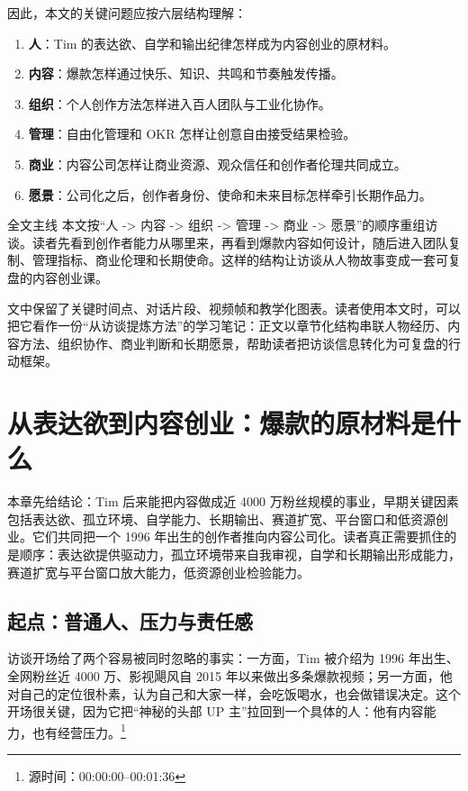 \documentclass[a4paper]{article}
\begin{document}
因此，本文的关键问题应按六层结构理解：

\begin{enumerate}
  \item \textbf{人}：Tim 的表达欲、自学和输出纪律怎样成为内容创业的原材料。
  \item \textbf{内容}：爆款怎样通过快乐、知识、共鸣和节奏触发传播。
  \item \textbf{组织}：个人创作方法怎样进入百人团队与工业化协作。
  \item \textbf{管理}：自由化管理和 OKR 怎样让创意自由接受结果检验。
  \item \textbf{商业}：内容公司怎样让商业资源、观众信任和创作者伦理共同成立。
  \item \textbf{愿景}：公司化之后，创作者身份、使命和未来目标怎样牵引长期作品力。
\end{enumerate}

\begin{importantbox}{全文主线}
本文按“人 -> 内容 -> 组织 -> 管理 -> 商业 -> 愿景”的顺序重组访谈。读者先看到创作者能力从哪里来，再看到爆款内容如何设计，随后进入团队复制、管理指标、商业伦理和长期使命。这样的结构让访谈从人物故事变成一套可复盘的内容创业课。
\end{importantbox}

文中保留了关键时间点、对话片段、视频帧和教学化图表。读者使用本文时，可以把它看作一份“从访谈提炼方法”的学习笔记：正文以章节化结构串联人物经历、内容方法、组织协作、商业判断和长期愿景，帮助读者把访谈信息转化为可复盘的行动框架。

\section{从表达欲到内容创业：爆款的原材料是什么}

本章先给结论：Tim 后来能把内容做成近 4000 万粉丝规模的事业，早期关键因素包括表达欲、孤立环境、自学能力、长期输出、赛道扩宽、平台窗口和低资源创业。它们共同把一个 1996 年出生的创作者推向内容公司化。读者真正需要抓住的是顺序：表达欲提供驱动力，孤立环境带来自我审视，自学和长期输出形成能力，赛道扩宽与平台窗口放大能力，低资源创业检验能力。

\subsection{起点：普通人、压力与责任感}

访谈开场给了两个容易被同时忽略的事实：一方面，Tim 被介绍为 1996 年出生、全网粉丝近 4000 万、影视飓风自 2015 年以来做出多条爆款视频；另一方面，他对自己的定位很朴素，认为自己和大家一样，会吃饭喝水，也会做错误决定。这个开场很关键，因为它把“神秘的头部 UP 主”拉回到一个具体的人：他有内容能力，也有经营压力。\footnote{源时间：00:00:00--00:01:36}
\end{document}
